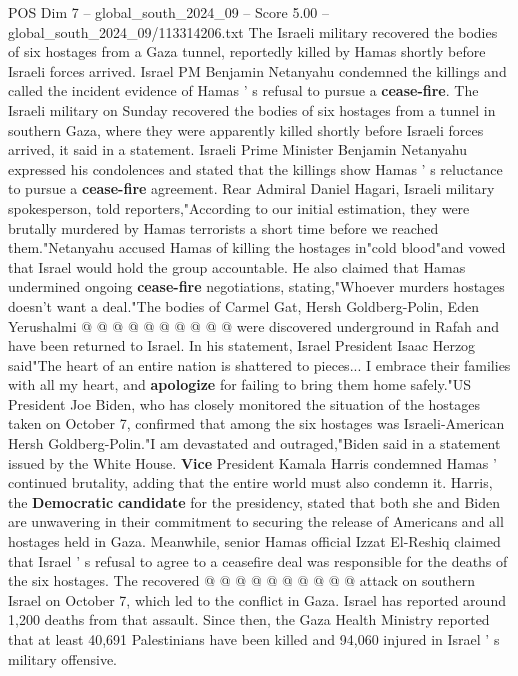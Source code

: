 \begin{textsample}{POS Dim 7 – global\_south\_2024\_09 – Score 5.00 – global\_south\_2024\_09/113314206.txt}  \label{ex:f7_pos_236}
The Israeli military recovered the bodies of six hostages from a Gaza tunnel, reportedly killed by Hamas shortly before Israeli forces arrived.
Israel PM Benjamin Netanyahu condemned the killings and called the incident evidence of Hamas ' s refusal to pursue a \textbf{cease-fire}.
The Israeli military on Sunday recovered the bodies of six hostages from a tunnel in southern Gaza, where they were apparently killed shortly before Israeli forces arrived, it said in a statement.
Israeli Prime Minister Benjamin Netanyahu expressed his condolences and stated that the killings show Hamas ' s reluctance to pursue a \textbf{cease-fire} agreement.
Rear Admiral Daniel Hagari, Israeli military spokesperson, told reporters,"According to our initial estimation, they were brutally murdered by Hamas terrorists a short time before we reached them."Netanyahu accused Hamas of killing the hostages in"cold blood"and vowed that Israel would hold the group accountable.
He also claimed that Hamas undermined ongoing \textbf{cease-fire} negotiations, stating,"Whoever murders hostages doesn't want a deal."The bodies of Carmel Gat, Hersh Goldberg-Polin, Eden Yerushalmi @ @ @ @ @ @ @ @ @ @ were discovered underground in Rafah and have been returned to Israel.
In his statement, Israel President Isaac Herzog said"The heart of an entire nation is shattered to pieces...
I embrace their families with all my heart, and \textbf{apologize} for failing to bring them home safely."US President Joe Biden, who has closely monitored the situation of the hostages taken on October 7, confirmed that among the six hostages was Israeli-American Hersh Goldberg-Polin."I am devastated and outraged,"Biden said in a statement issued by the White House. \textbf{Vice} President Kamala Harris condemned Hamas ' continued brutality, adding that the entire world must also condemn it.
Harris, the \textbf{Democratic} \textbf{candidate} for the presidency, stated that both she and Biden are unwavering in their commitment to securing the release of Americans and all hostages held in Gaza.
Meanwhile, senior Hamas official Izzat El-Reshiq claimed that Israel ' s refusal to agree to a ceasefire deal was responsible for the deaths of the six hostages.
The recovered @ @ @ @ @ @ @ @ @ @ attack on southern Israel on October 7, which led to the conflict in Gaza.
Israel has reported around 1,200 deaths from that assault.
Since then, the Gaza Health Ministry reported that at least 40,691 Palestinians have been killed and 94,060 injured in Israel ' s military offensive.

\end{textsample}
